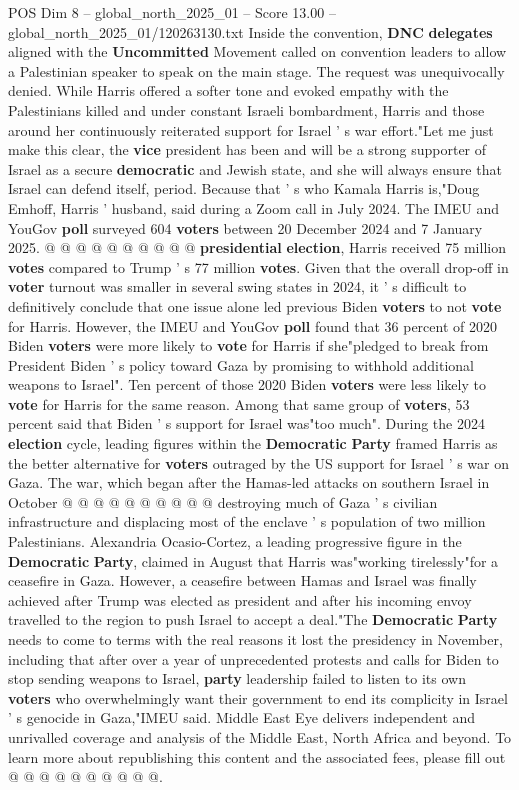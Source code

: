 \begin{textsample}{POS Dim 8 – global\_north\_2025\_01 – Score 13.00 – global\_north\_2025\_01/120263130.txt}
Inside the convention, \textbf{DNC} \textbf{delegates} aligned with the \textbf{Uncommitted} Movement called on convention leaders to allow a Palestinian speaker to speak on the main stage.
The request was unequivocally denied.
While Harris offered a softer tone and evoked empathy with the Palestinians killed and under constant Israeli bombardment, Harris and those around her continuously reiterated support for Israel ' s war effort."Let me just make this clear, the \textbf{vice} president has been and will be a strong supporter of Israel as a secure \textbf{democratic} and Jewish state, and she will always ensure that Israel can defend itself, period.
Because that ' s who Kamala Harris is,"Doug Emhoff, Harris ' husband, said during a Zoom call in July 2024.
The IMEU and YouGov \textbf{poll} surveyed 604 \textbf{voters} between 20 December 2024 and 7 January 2025. @ @ @ @ @ @ @ @ @ @ \textbf{presidential} \textbf{election}, Harris received 75 million \textbf{votes} compared to Trump ' s 77 million \textbf{votes}.
Given that the overall drop-off in \textbf{voter} turnout was smaller in several swing states in 2024, it ' s difficult to definitively conclude that one issue alone led previous Biden \textbf{voters} to not \textbf{vote} for Harris.
However, the IMEU and YouGov \textbf{poll} found that 36 percent of 2020 Biden \textbf{voters} were more likely to \textbf{vote} for Harris if she"pledged to break from President Biden ' s policy toward Gaza by promising to withhold additional weapons to Israel".
Ten percent of those 2020 Biden \textbf{voters} were less likely to \textbf{vote} for Harris for the same reason.
Among that same group of \textbf{voters}, 53 percent said that Biden ' s support for Israel was"too much".
During the 2024 \textbf{election} cycle, leading figures within the \textbf{Democratic} \textbf{Party} framed Harris as the better alternative for \textbf{voters} outraged by the US support for Israel ' s war on Gaza.
The war, which began after the Hamas-led attacks on southern Israel in October @ @ @ @ @ @ @ @ @ @ destroying much of Gaza ' s civilian infrastructure and displacing most of the enclave ' s population of two million Palestinians.
Alexandria Ocasio-Cortez, a leading progressive figure in the \textbf{Democratic} \textbf{Party}, claimed in August that Harris was"working tirelessly"for a ceasefire in Gaza.
However, a ceasefire between Hamas and Israel was finally achieved after Trump was elected as president and after his incoming envoy travelled to the region to push Israel to accept a deal."The \textbf{Democratic} \textbf{Party} needs to come to terms with the real reasons it lost the presidency in November, including that after over a year of unprecedented protests and calls for Biden to stop sending weapons to Israel, \textbf{party} leadership failed to listen to its own \textbf{voters} who overwhelmingly want their government to end its complicity in Israel ' s genocide in Gaza,"IMEU said.
Middle East Eye delivers independent and unrivalled coverage and analysis of the Middle East, North Africa and beyond.
To learn more about republishing this content and the associated fees, please fill out @ @ @ @ @ @ @ @ @ @.


\end{textsample}
